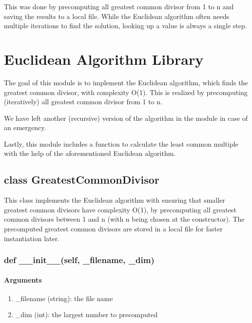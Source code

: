 \documentclass[refman]{scrartcl}
\begin{document}
This was done by precomputing all greatest common divisor from 1 to n and saving the results to a local file. While the Euclidean algorithm often needs multiple iterations to find the solution, looking up a value is always a single step.

\section{Euclidean Algorithm Library}

The goal of this module is to implement the Euclidean algorithm, which finds the greatest common divisor, with complexity O(1). This is realized by precomputing (iteratively) all greatest common divisor from 1 to n.

We have left another (recursive) version of the algorithm in the module in case of an emergency.

Lastly, this module includes a function to calculate the least common multiple with the help of the aforementioned Euclidean algorithm.

\subsection{class GreatestCommonDivisor}

This class implements the Euclidean algorithm with ensuring that smaller greatest common divisors have complexity O(1), by precomputing all greatest common divisors between 1 and n (with n being chosen at the constructor). The precomputed greatest common divisors are stored in a local file for faster instantiation later.

\subsubsection{def \_\_init\_\_(self, \_filename, \_dim)}

\paragraph*{Arguments}

\begin{enumerate}
	\item \_filename (string): the file name
	\item \_dim (int): the largest number to precomputed
\end{enumerate}
\end{document}
